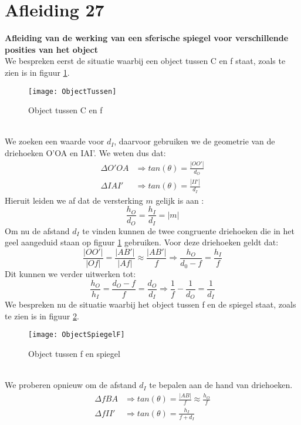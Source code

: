 \documentclass[a4paper,kul]{kulakarticle} %
\begin{document}
\section{Afleiding 27}
\textbf{Afleiding van de werking van een sferische spiegel voor verschillende posities van het object}\\
We bespreken eerst de situatie waarbij een object tussen C en f staat, zoals te zien is in figuur \ref{fig:objecttussen}.
\begin{figure}[h]
	\centering
	\texttt{[image: ObjectTussen]}
	\caption[Object tussen C en f]{Object tussen C en f}
	\label{fig:objecttussen}
\end{figure}\\
We zoeken een waarde voor $d_I$, daarvoor gebruiken we de geometrie van de driehoeken O'OA en IAI'.  We weten dus dat: 
\begin{align*}
	\Delta O'OA&\Rightarrow tan(\theta) = \frac{|OO'|}{d_O}\\
	\Delta IAI'&\Rightarrow tan(\theta) = \frac{|II'|}{d_I}
\end{align*}
Hieruit leiden we af dat de versterking $m$ gelijk is aan :
\begin{equation*}
	\frac{h_O}{d_O} = \frac{h_I}{d_I} = |m|
\end{equation*}
Om nu de afstand $d_I$ te vinden kunnen de twee congruente driehoeken die in het geel aangeduid staan op figuur \ref{fig:objecttussen} gebruiken. Voor deze driehoeken geldt dat: 
\begin{equation*}
	\frac{|OO'|}{|Of|}=\frac{|AB'|}{|Af|} \approx\frac{|AB'|}{f} \Rightarrow \frac{h_O}{d_0-f} = \frac{h_I}{f}
\end{equation*}
Dit kunnen we verder uitwerken tot:
\begin{equation*}
	\frac{h_O}{h_I} = \frac{d_O-f}{f}=\frac{d_O}{d_I}\Rightarrow\frac{1}{f}-\frac{1}{d_O} = \frac{1}{d_I}
\end{equation*}
\newpage
We bespreken nu de situatie waarbij het object tussen f en de spiegel staat, zoals te zien is in figuur \ref{fig:objectspiegelf}.
\begin{figure}[h]
	\centering
	\texttt{[image: ObjectSpiegelF]}
	\caption[Object tussen f en spiegel]{Object tussen f en spiegel}
	\label{fig:objectspiegelf}
\end{figure}\\
We proberen opnieuw om de afstand $d_I$ te bepalen aan de hand van driehoeken.
\begin{align*}
	\Delta fBA&\Rightarrow tan(\theta)=\frac{|AB|}{f}\approx\frac{h_O}{f}\\
	\Delta fII'&\Rightarrow tan(\theta)= \frac{h_I}{f+d_I}
\end{align*}
\end{document}
